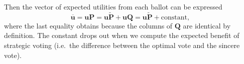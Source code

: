 \documentclass[11pt,a4paper]{article}
\begin{document}
Then the vector of expected utilities from each ballot can be expressed 
\[ \overline{\mathbf{u}} = \mathbf{u} \mathbf{P} =  \mathbf{u} \tilde{\mathbf{P}} +  \mathbf{u}  \mathbf{Q} = \mathbf{u}  \tilde{\mathbf{P}} + \text{constant},  
\]
where the last equality obtains because the columns of $\mathbf{Q}$ are identical by definition. The constant drops out when we compute the expected benefit of strategic voting (i.e.\ the difference between the optimal vote and the sincere vote). 
\end{document}
